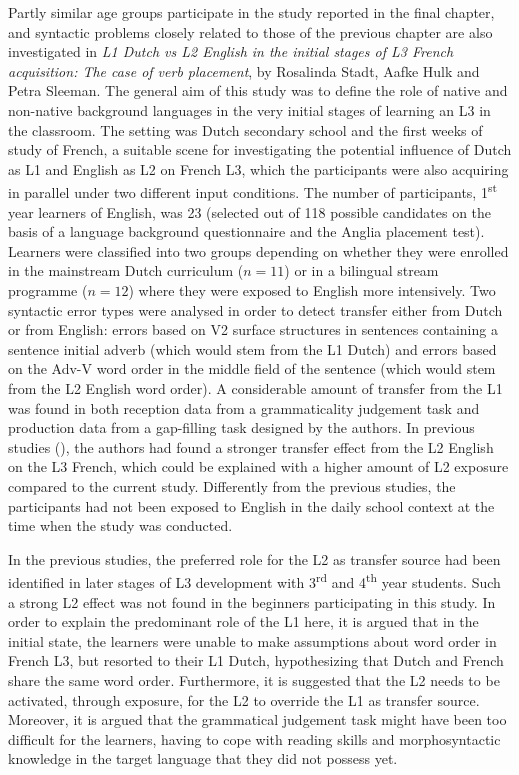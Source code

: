 \documentclass[output=paper,colorlinks,citecolor=brown,nonflat]{langsci/langscibook}
\begin{document}
Partly similar age groups participate in the study reported in the final chapter, and syntactic problems closely related to those of the previous chapter are also investigated in \textit{L1 Dutch vs L2 English in the initial stages of L3 French acquisition: The case of verb placement}, by Rosalinda Stadt, Aafke Hulk and Petra Sleeman. The general aim of this study was to define the role of native and non-native background languages in the very initial stages of learning an L3 in the classroom. The setting was Dutch secondary school and the first weeks of study of French, a suitable scene for investigating the potential influence of Dutch as L1 and English as L2 on French L3, which the participants were also acquiring in parallel under two different input conditions. The number of participants, 1\textsuperscript{st} year learners of English, was 23 (selected out of 118 possible candidates on the basis of a language background questionnaire and the Anglia placement test). Learners were classified into two groups depending on whether they were enrolled in the mainstream Dutch curriculum ($n = 11$) or in a bilingual stream programme ($n = 12$) where they were exposed to English more intensively. Two syntactic error types were analysed in order to detect transfer either from Dutch or from English: errors based on V2 surface structures in sentences containing a sentence initial adverb (which would stem from the L1 Dutch) and errors based on the Adv-V word order in the middle field of the sentence (which would stem from the L2 English word order). A considerable amount of transfer from the L1 was found in both reception data from a grammaticality judgement task and production data from a gap-filling task designed by the authors. In previous studies (\citealt{StadtEtAl2016, StadtEtAl2018Exposure}), the authors had found a stronger transfer effect from the L2 English on the L3 French, which could be explained with a higher amount of L2 exposure compared to the current study. Differently from the previous studies, the participants had not been exposed to English in the daily school context at the time when the study was conducted.

In the previous studies, the preferred role for the L2 as transfer source had been identified in later stages of L3 development with 3\textsuperscript{rd} and 4\textsuperscript{th} year students. Such a strong L2 effect was not found in the beginners participating in this study. In order to explain the predominant role of the L1 here, it is argued that in the initial state, the learners were unable to make assumptions about word order in French L3, but resorted to their L1 Dutch, hypothesizing that Dutch and French share the same word order. Furthermore, it is suggested that the L2 needs to be activated, through exposure, for the L2 to override the L1 as transfer source. Moreover, it is argued that the grammatical judgement task might have been too difficult for the learners, having to cope with reading skills and morphosyntactic knowledge in the target language that they did not possess yet.
\end{document}
